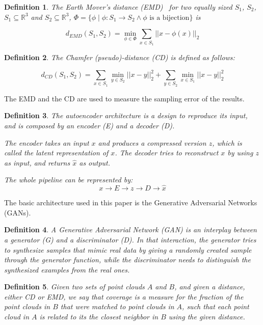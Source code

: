 \documentclass[12pt]{article}
\newtheorem{definition}{Definition}
\begin{document}
    \begin{definition}
        The \emph{Earth Mover's distance (EMD)}~\cite{doi:10.1023/A:1026543900054} for two equally sized $S_{1}$, $S_{2}$, $S_{1} \subseteq \mathbb{R} ^{3}$ and $S_{2} \subseteq \mathbb{R} ^{3}$, $\Phi = \{ \phi \mid \phi: S_{1} \to S_{2} \land \phi \text{ is a bijection}\}$ is

        \[d_{EMD}(S_{1}, S_{2}) = \min _{\phi \in \Phi} \sum_{x \in S_{1}} || x - \phi(x)||_{2}\]
    \end{definition}

    \begin{definition}
        The \emph{Chamfer (pseudo)-distance (CD)} is defined as follows:

        \[d_{CD}(S_{1}, S_{2}) = \sum_{x \in S_{1}} \min _{y \in S_{2}} || x - y||_{2}^{2} +
        \sum_{y \in S_{2}} \min_{x \in S_{1}} ||x - y||_{2}^{2}\]
    \end{definition}

    The EMD and the CD are used to measure the sampling error of the results.

    \begin{definition}
        The \emph{autoencoder} architecture is a design to reproduce its input, and is composed by an \emph{encoder} (E) and a \emph{decoder} (D).

        The encoder takes an input $x$ and produces a compressed version $z$, which is called the \emph{latent representation} of $x$. The decoder tries to reconstruct $x$ by using $z$ as input, and returns $\hat{x}$ as output.

        The whole pipeline can be represented by:
        \[x \to E \to z \to D \to \hat{x}\]
    \end{definition}

    The basic architecture used in this paper is the Generative Adversarial Networks (GANs).

    \begin{definition}
        A \emph{Generative Adversarial Network} (GAN) is an interplay between a \emph{generator} (G) and a \emph{discriminator} (D).
        In that interaction, the generator tries to synthesize samples that mimic real data by giving a randomly created sample through the generator function, while the discriminator needs to distinguish the synthesized examples from the real ones.
    \end{definition}

    \begin{definition}
        Given two sets of point clouds $A$ and $B$, and given a distance, either CD or EMD, we say that \emph{coverage} is a measure for the fraction of the point clouds in $B$ that were matched to point clouds in $A$, such that each point cloud in $A$ is related to its the closest neighbor in $B$ using the given distance.
    \end{definition}
\end{document}
